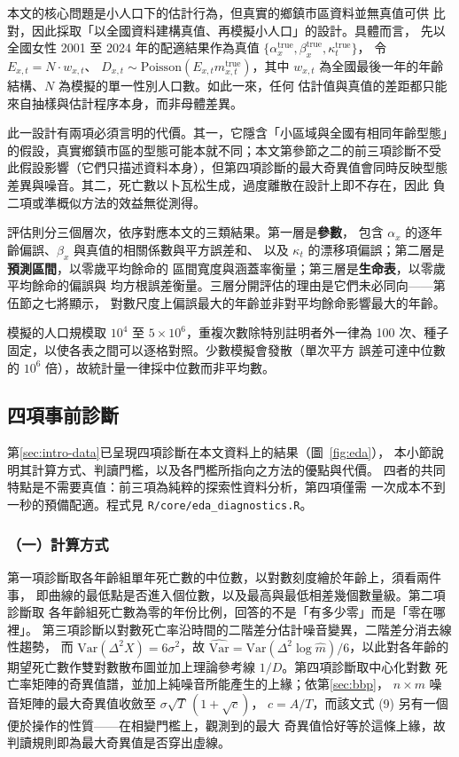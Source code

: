 \documentclass[UTF8, fontset=macnew, a4paper, 12pt]{ctexart}
\begin{document}
本文的核心問題是小人口下的估計行為，但真實的鄉鎮市區資料並無真值可供
比對，因此採取「以全國資料建構真值、再模擬小人口」的設計。具體而言，
先以全國女性 2001 至 2024 年的配適結果作為真值
$\{\alpha^{\text{true}}_x,\beta^{\text{true}}_x,\kappa^{\text{true}}_t\}$，
令 $E_{x,t}=N\cdot w_{x,t}$、
$D_{x,t}\sim\text{Poisson}(E_{x,t}m^{\text{true}}_{x,t})$，其中 $w_{x,t}$
為全國最後一年的年齡結構、$N$ 為模擬的單一性別人口數。如此一來，任何
估計值與真值的差距都只能來自抽樣與估計程序本身，而非母體差異。

此一設計有兩項必須言明的代價。其一，它隱含「小區域與全國有相同年齡型態」
的假設，真實鄉鎮市區的型態可能本就不同；本文第參節之二的前三項診斷不受
此假設影響（它們只描述資料本身），但第四項診斷的最大奇異值會同時反映型態
差異與噪音。其二，死亡數以卜瓦松生成，過度離散在設計上即不存在，因此
負二項或準概似方法的效益無從測得。

評估則分三個層次，依序對應本文的三類結果。第一層是\textbf{參數}，
包含 $\alpha_x$ 的逐年齡偏誤、$\beta_x$ 與真值的相關係數與平方誤差和、
以及 $\kappa_t$ 的漂移項偏誤；第二層是\textbf{預測區間}，以零歲平均餘命的
區間寬度與涵蓋率衡量；第三層是\textbf{生命表}，以零歲平均餘命的偏誤與
均方根誤差衡量。三層分開評估的理由是它們未必同向——第伍節之七將顯示，
對數尺度上偏誤最大的年齡並非對平均餘命影響最大的年齡。

模擬的人口規模取 $10^4$ 至 $5\times10^6$，重複次數除特別註明者外一律為
100 次、種子固定，以使各表之間可以逐格對照。少數模擬會發散（單次平方
誤差可達中位數的 $10^6$ 倍），故統計量一律採中位數而非平均數。

\subsection{四項事前診斷}\label{sec:eda}

第\ref{sec:intro-data}已呈現四項診斷在本文資料上的結果（圖~\ref{fig:eda}），
本小節說明其計算方式、判讀門檻，以及各門檻所指向之方法的優點與代價。
四者的共同特點是不需要真值：前三項為純粹的探索性資料分析，第四項僅需
一次成本不到一秒的預備配適。程式見 \texttt{R/core/eda\_diagnostics.R}。

\subsubsection{（一）計算方式}

第一項診斷取各年齡組單年死亡數的中位數，以對數刻度繪於年齡上，須看兩件事，
即曲線的最低點是否進入個位數，以及最高與最低相差幾個數量級。第二項診斷取
各年齡組死亡數為零的年份比例，回答的不是「有多少零」而是「零在哪裡」。
第三項診斷以對數死亡率沿時間的二階差分估計噪音變異，二階差分消去線性趨勢，
而 $\mathrm{Var}(\Delta^2 X)=6\sigma^2$，故
$\widehat{\mathrm{Var}}=\mathrm{Var}(\Delta^2\log\hat m)/6$，以此對各年齡的
期望死亡數作雙對數散布圖並加上理論參考線 $1/D$。第四項診斷取中心化對數
死亡率矩陣的奇異值譜，並加上純噪音所能產生的上緣；依第\ref{sec:bbp}，
$n\times m$ 噪音矩陣的最大奇異值收斂至 $\sigma\sqrt{T}\,(1+\sqrt{c})$，
$c=A/T$，而該文式 (9) 另有一個便於操作的性質——在相變門檻上，觀測到的最大
奇異值恰好等於這條上緣，故判讀規則即為最大奇異值是否穿出虛線。
\end{document}

